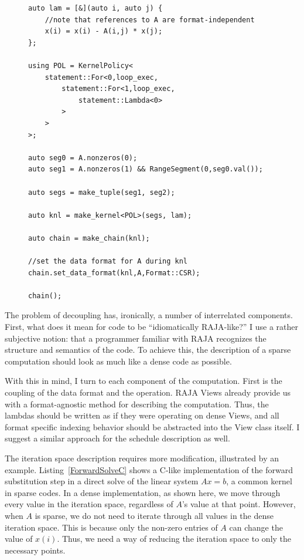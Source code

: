 \documentclass{article}
\begin{document}
\begin{figure}
\begin{lstlisting}[caption={Possible RAJA implementation of forward substitution.},label={ForwardSolveRAJA}]
auto lam = [&](auto i, auto j) {
    //note that references to A are format-independent
    x(i) = x(i) - A(i,j) * x(j);
};

using POL = KernelPolicy<
    statement::For<0,loop_exec,
        statement::For<1,loop_exec,
            statement::Lambda<0>
        >
    >
>;

auto seg0 = A.nonzeros(0);
auto seg1 = A.nonzeros(1) && RangeSegment(0,seg0.val());

auto segs = make_tuple(seg1, seg2);

auto knl = make_kernel<POL>(segs, lam);

auto chain = make_chain(knl);

//set the data format for A during knl
chain.set_data_format(knl,A,Format::CSR);

chain();

\end{lstlisting}
\end{figure}

The problem of decoupling has, ironically, a number of interrelated components.
First, what does it mean for code to be \enquote{idiomatically RAJA-like?}
I use a rather subjective notion: that a programmer familiar with RAJA recognizes the structure and semantics of the code. 
To achieve this, the description of a sparse computation should look as much like a dense code as possible. 

With this in mind, I turn to each component of the computation.
First is the coupling of the data format and the operation.
RAJA Views already provide us with a format-agnostic method for describing the computation. 
Thus, the lambdas should be written as if they were operating on dense Views, and all format specific indexing behavior should be abstracted into the View class itself. 
I suggest a similar approach for the schedule description as well.

The iteration space description requires more modification, illustrated by an example.
Listing~\ref{ForwardSolveC} shows a C-like implementation of the forward substitution step in a direct solve of the linear system $Ax=b$, a common kernel in sparse codes.
In a dense implementation, as shown here, we move through every value in the iteration space, regardless of $A$'s value at that point.
However, when $A$ is sparse, we do not need to iterate through all values in the dense iteration space.
This is because only the non-zero entries of $A$ can change the value of $x(i)$. 
Thus, we need a way of reducing the iteration space to only the necessary points. 
\end{document}

